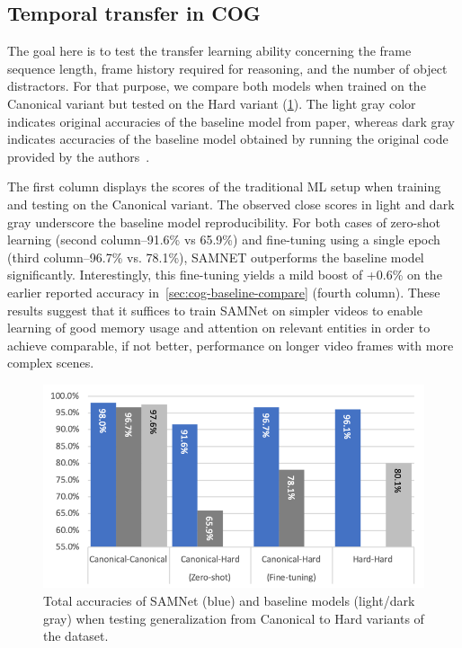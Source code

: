  

\subsection{Temporal transfer in COG}
\label{sec:temporal}

The goal here is to test the transfer learning ability concerning the frame sequence length, frame history required
for reasoning, and the number of object distractors.
For that purpose, we compare both models when trained on the Canonical variant but tested on the 
Hard variant (\cref{fig:samnet_cog_overall_transfer}).
The light gray color indicates original accuracies of the baseline model from paper, 
whereas dark gray indicates accuracies of the baseline model
obtained by running the original code provided by the authors~\cite{yang2018implement}.

The first column displays the scores of the traditional ML setup when training and testing on the Canonical variant. 
The observed close scores in light and dark gray underscore the baseline model reproducibility.
For both cases of zero-shot learning (second column--91.6\% vs 65.9\%) and fine-tuning using a single epoch 
(third column--96.7\% vs. 78.1\%), SAMNET outperforms the baseline model significantly.
Interestingly, this fine-tuning yields a mild boost of +0.6\% on the earlier reported accuracy 
in~\cref{sec:cog-baseline-compare} (fourth column).
These results suggest that it suffices to train SAMNet on simpler videos 
to enable learning of good memory usage and attention on relevant entities  
in order to achieve comparable, if not better, 
performance on longer video frames with more complex scenes.

\begin{figure}[htb]
	\centering
	\includegraphics[width=\columnwidth]{img/results/samnet_cog_overall_transfer.png}
	\caption{Total accuracies of SAMNet (blue) and baseline models (light/dark gray) when testing generalization from Canonical to Hard variants of the dataset.}
	\label{fig:samnet_cog_overall_transfer}
\end{figure}


